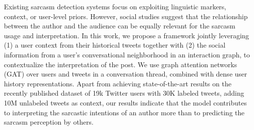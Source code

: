 Existing sarcasm detection systems focus on exploiting linguistic markers, context, or user-level priors. However, social studies suggest that the relationship between the author and the audience can be equally relevant for the sarcasm usage and interpretation. In this work, we propose a framework jointly leveraging (1) a user context from their historical tweets together with (2) the social information from a user's conversational neighborhood in an interaction graph, to contextualize the interpretation of the post. We use graph attention networks (GAT) over users and tweets in a conversation thread, combined with dense user history representations. Apart from achieving state-of-the-art results on the recently published dataset of 19k Twitter users with 30K labeled tweets, adding 10M unlabeled tweets as context, our results indicate that the model contributes to interpreting the sarcastic intentions of an author more than to predicting the sarcasm perception by others.
